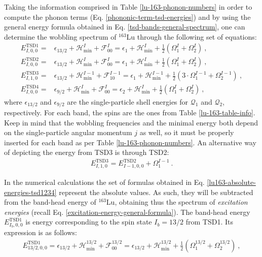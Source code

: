 Taking the information comprised in Table \ref{lu-163-phonon-numbers} in order to compute the phonon terms (Eq. \ref{phononic-term-tsd-energies}) and by using the general energy formula obtained in Eq. \ref{tsd-bands-general-spectrum}, one can determine the wobbling spectrum of $^{163}$Lu through the following set of equations:
\begin{align}
    E_{I,0,0}^\text{TSD1}=&\epsilon_{13/2}+\mathcal{H}_\text{min}^I+\mathcal{F}_{00}^I=\epsilon_1+\mathcal{H}_\text{min}^I+\frac{1}{2}\left(\Omega_1^I+\Omega_2^I\right)\ ,\nonumber\\
    E_{I,0,0}^\text{TSD2}=&\epsilon_{13/2}+\mathcal{H}_\text{min}^I+\mathcal{F}_{00}^I=\epsilon_1+\mathcal{H}_\text{min}^I+\frac{1}{2}\left(\Omega_1^I+\Omega_2^I\right)\ ,\nonumber\\
    E_{I,1,0}^\text{TSD3}=&\epsilon_{13/2}+\mathcal{H}_\text{min}^{I-1}+\mathcal{F}_{10}^{I-1}=\epsilon_1+\mathcal{H}_\text{min}^{I-1}+\frac{1}{2}\left(3\cdot\Omega_1^{I-1}+\Omega_2^{I-1}\right)\ ,\nonumber\\
    E_{I,0,0}^\text{TSD4}=&\epsilon_{9/2}+\mathcal{H}_\text{min}^{I}+\mathcal{F}_{00}^{I}=\epsilon_2+\mathcal{H}_\text{min}^{I}+\frac{1}{2}\left(\Omega_1^{I}+\Omega_2^{I}\right)\ ,
    \label{lu163-absolute-energies-tsd1234}
\end{align}
where $\epsilon_{13/2}$ and $\epsilon_{9/2}$ are the single-particle shell energies for $\mathcal{Q}_1$ and $\mathcal{Q}_2$, respectively. For each band, the spins are the ones from Table \ref{lu-163-table-info}. Keep in mind that the wobbling frequencies and the minimal energy both depend on the single-particle angular momentum $j$ as well, so it must be properly inserted for each band as per Table \ref{lu-163-phonon-numbers}. An alternative way of depicting the energy from TSD3 is through TSD2:
\begin{align}
    E_{I,1,0}^\text{TSD3}=E_{I-1,0,0}^\text{TSD2}+\Omega_1^{I-1}\ .\nonumber
\end{align}

In the numerical calculations the set of formulas obtained in Eq. \ref{lu163-absolute-energies-tsd1234} represent the absolute values. As such, they will be subtracted from the band-head energy of $^{163}$Lu, obtaining thus the spectrum of \emph{excitation energies} (recall Eq. \ref{excitation-energy-general-formula}). The band-head energy $E_{I_b,0,0}^\text{TSD1}$ is energy corresponding to the spin state $I_b=13/2$ from TSD1. Its expression is as follows:
\begin{align}
    E_{13/2,0,0}^\text{TSD1}=\epsilon_{13/2}+\mathcal{H}_\text{min}^{13/2}+\mathcal{F}_{00}^{13/2}=\epsilon_{13/2}+\mathcal{H}_\text{min}^{13/2}+\frac{1}{2}\left(\Omega_1^{13/2}+\Omega_2^{13/2}\right)\ , \nonumber
\end{align}

